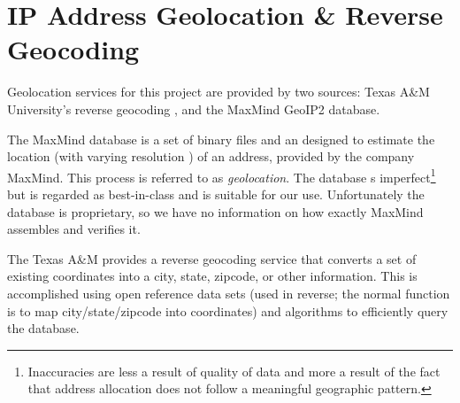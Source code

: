 \section{IP Address Geolocation \& Reverse Geocoding}\label{sec:background_geolocation}

Geolocation services for this project are provided by two sources: Texas A\&M University's reverse geocoding \api, and the MaxMind GeoIP2 database.

The MaxMind database is a set of binary files and an \sdk designed to estimate the location (with varying resolution \cite{MaxmindResolution2020}) of an \ip address, provided by the company MaxMind. This process is referred to as \textit{\ip geolocation}. The database s imperfect\footnote{Inaccuracies are less a result of quality of data and more a result of the fact that \ip address allocation does not follow a meaningful geographic pattern.} but is regarded as best-in-class and is suitable for our use. Unfortunately the database is proprietary, so we have no information on how exactly MaxMind assembles and verifies it.

The Texas A\&M \api provides a reverse geocoding service that converts a set of existing coordinates into a city, state, zipcode, or other information. This is accomplished using open reference data sets (used in reverse; the normal function is to map city/state/zipcode into coordinates) and algorithms to efficiently query the database.
